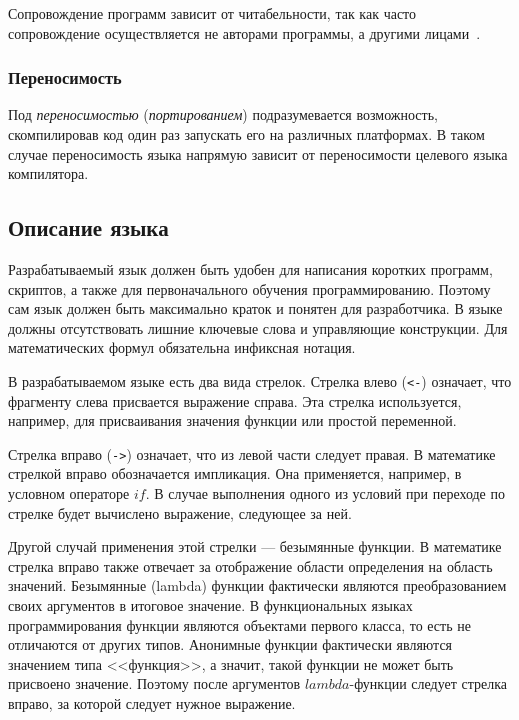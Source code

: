             Сопровождение программ зависит от читабельности, так как часто сопровождение осуществляется не авторами программы, а другими лицами~\cite{langs}.
        \subsubsection{Переносимость}
            Под \textit{переносимостью} (\textit{портированием}) подразумевается возможность, скомпилировав код один раз запускать его на различных платформах.
            В таком случае переносимость языка напрямую зависит от переносимости целевого языка компилятора.
    \subsection{Описание языка}
        Разрабатываемый язык должен быть удобен для написания коротких программ, скриптов, а также для первоначального обучения программированию.
        Поэтому сам язык должен быть максимально краток и понятен для разработчика.
        В языке должны отсутствовать лишние ключевые слова и управляющие конструкции.
        Для математических формул обязательна инфиксная нотация.

        В разрабатываемом языке есть два вида стрелок.
        Стрелка влево (\verb!<-!) означает, что фрагменту слева присвается выражение справа.
        Эта стрелка используется, например, для присваивания значения функции или простой переменной.

        Стрелка вправо (\verb!->!) означает, что из левой части следует правая.
        В математике стрелкой вправо обозначается импликация.
        Она применяется, например, в условном операторе $if$.
        В случае выполнения одного из условий при переходе по стрелке будет вычислено выражение, следующее за ней.
        
        Другой случай применения этой стрелки --- безымянные функции.
        В математике стрелка вправо также отвечает за отображение области определения на область значений.
        Безымянные (lambda) функции фактически являются преобразованием своих аргументов в итоговое значение.
        В функциональных языках программирования функции являются объектами первого класса, то есть не отличаются от других типов.
        Анонимные функции фактически являются значением типа <<функция>>, а значит, такой функции не может быть присвоено значение.
        Поэтому после аргументов $lambda$-функции следует стрелка вправо, за которой следует нужное выражение.

